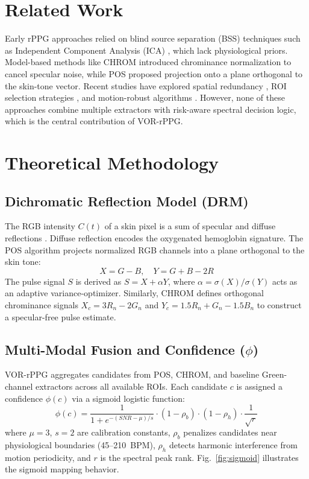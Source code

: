 \documentclass[9pt,technote,twocolumn,compsoc]{article}
\begin{document}
\section{Related Work}
Early rPPG approaches relied on blind source separation (BSS) techniques such as Independent Component Analysis (ICA) \cite{poh2011}, which lack physiological priors. Model-based methods like CHROM \cite{haan2013} introduced chrominance normalization to cancel specular noise, while POS \cite{wang2017} proposed projection onto a plane orthogonal to the skin-tone vector. Recent studies have explored spatial redundancy \cite{wang2015}, ROI selection strategies \cite{lempe2013,pilz2018}, and motion-robust algorithms \cite{moco2016}. However, none of these approaches combine multiple extractors with risk-aware spectral decision logic, which is the central contribution of VOR-rPPG.

\section{Theoretical Methodology}
\subsection{Dichromatic Reflection Model (DRM)}
The RGB intensity $C(t)$ of a skin pixel is a sum of specular and diffuse reflections \cite{verkruysse2008}. Diffuse reflection encodes the oxygenated hemoglobin signature. The POS algorithm \cite{wang2017} projects normalized RGB channels into a plane orthogonal to the skin tone:
\begin{equation}
    X = G - B, \quad Y = G + B - 2R
\end{equation}
The pulse signal $S$ is derived as $S = X + \alpha Y$, where $\alpha = \sigma(X)/\sigma(Y)$ acts as an adaptive variance-optimizer. Similarly, CHROM \cite{haan2013} defines orthogonal chrominance signals $X_c = 3R_n - 2G_n$ and $Y_c = 1.5R_n + G_n - 1.5B_n$ to construct a specular-free pulse estimate.

\subsection{Multi-Modal Fusion and Confidence ($\phi$)}
VOR-rPPG aggregates candidates from POS, CHROM, and baseline Green-channel extractors across all available ROIs. Each candidate $c$ is assigned a confidence $\phi(c)$ via a sigmoid logistic function:
\begin{equation}
    \phi(c) = \frac{1}{1 + e^{-(SNR-\mu)/s}} \cdot (1 - \rho_{b}) \cdot (1 - \rho_{h}) \cdot \frac{1}{\sqrt{r}}
\end{equation}
where $\mu{=}3$, $s{=}2$ are calibration constants, $\rho_{b}$ penalizes candidates near physiological boundaries (45--210~BPM), $\rho_{h}$ detects harmonic interference from motion periodicity, and $r$ is the spectral peak rank. Fig.~\ref{fig:sigmoid} illustrates the sigmoid mapping behavior.
\end{document}
